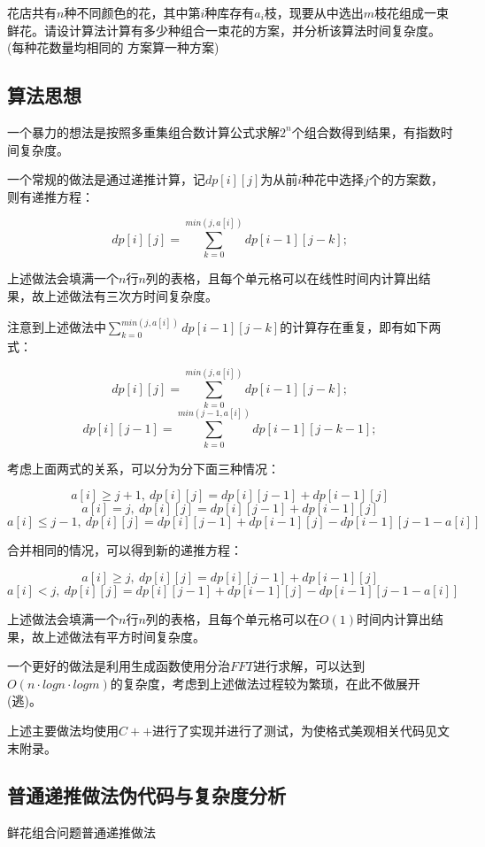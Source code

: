 \documentclass{article}
\begin{document}
花店共有$n$种不同颜色的花，其中第$i$种库存有$a_i$枝，现要从中选出$m$枝花组成一束鲜花。请设计算法计算有多少种组合一束花的方案，并分析该算法时间复杂度。(每种花数量均相同的
方案算一种方案)

\subsection{算法思想}

一个暴力的想法是按照多重集组合数计算公式求解$2^n$个组合数得到结果，有指数时间复杂度。

一个常规的做法是通过递推计算，记$dp[i][j]$为从前$i$种花中选择$j$个的方案数，则有递推方程：

$$
dp[i][j]=\sum_{k=0}^{min(j,a[i])}dp[i-1][j-k];
$$

上述做法会填满一个$n$行$n$列的表格，且每个单元格可以在线性时间内计算出结果，故上述做法有三次方时间复杂度。

注意到上述做法中$\sum_{k=0}^{min(j,a[i])}dp[i-1][j-k]$的计算存在重复，即有如下两式：

$$
dp[i][j]=\sum_{k=0}^{min(j,a[i])}dp[i-1][j-k];
$$
$$
dp[i][j-1]=\sum_{k=0}^{min(j-1,a[i])}dp[i-1][j-k-1];
$$

考虑上面两式的关系，可以分为分下面三种情况：

$$
a[i]\ge{j}+1,\ dp[i][j]=dp[i][j-1]+dp[i-1][j]
$$
$$
a[i]=j,\ dp[i][j]=dp[i][j-1]+dp[i-1][j]
$$
$$
a[i]\le{j}-1,\ dp[i][j]=dp[i][j-1]+dp[i-1][j]-dp[i-1][j-1-a[i]]
$$

合并相同的情况，可以得到新的递推方程：

$$
a[i]\ge{j},\ dp[i][j]=dp[i][j-1]+dp[i-1][j]
$$
$$
a[i]<j,\ dp[i][j]=dp[i][j-1]+dp[i-1][j]-dp[i-1][j-1-a[i]]
$$

上述做法会填满一个$n$行$n$列的表格，且每个单元格可以在$O(1)$时间内计算出结果，故上述做法有平方时间复杂度。

一个更好的做法是利用生成函数使用分治$FFT$进行求解，可以达到$O(n\cdot{log}n\cdot{log}m)$的复杂度，考虑到上述做法过程较为繁琐，在此不做展开(逃)。

上述主要做法均使用$C++$进行了实现并进行了测试，为使格式美观相关代码见文末附录。

\subsection{普通递推做法伪代码与复杂度分析}

\begin{algorithm}[H]

\caption{鲜花组合问题普通递推做法}
\LinesNumbered
{}


\end{algorithm}
\end{document}

